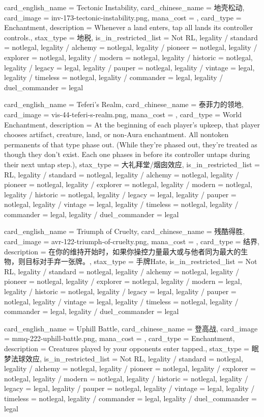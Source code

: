 \documentclass[lang = cn, color = black, 10pt]{AllThatStax}
\begin{document}
\card
{
	card_english_name = {Tectonic Instability},
	card_chinese_name = {地壳松动},
	card_image = inv-173-tectonic-instability.png,
	mana_cost = ,
	card_type = Enchantment,
	description = {Whenever a land enters, tap all lands its controller controls.},
	stax_type = 地税,
	is_in_restricted_list = Not RL,
	legality / standard = notlegal,
	legality / alchemy = notlegal,
	legality / pioneer = notlegal,
	legality / explorer = notlegal,
	legality / modern = notlegal,
	legality / historic = notlegal,
	legality / legacy = legal,
	legality / pauper = notlegal,
	legality / vintage = legal,
	legality / timeless = notlegal,
	legality / commander = legal,
	legality / duel_commander = legal
}

\card
{
	card_english_name = {Teferi's Realm},
	card_chinese_name = {泰菲力的领地},
	card_image = vis-44-teferi-s-realm.png,
	mana_cost = ,
	card_type = World Enchantment,
	description = {At the beginning of each player's upkeep, that player chooses artifact, creature, land, or non-Aura enchantment. All nontoken permanents of that type phase out. (While they're phased out, they're treated as though they don't exist. Each one phases in before its controller untaps during their next untap step.)},
	stax_type = 大礼拜堂/烟囱效应,
	is_in_restricted_list = RL,
	legality / standard = notlegal,
	legality / alchemy = notlegal,
	legality / pioneer = notlegal,
	legality / explorer = notlegal,
	legality / modern = notlegal,
	legality / historic = notlegal,
	legality / legacy = legal,
	legality / pauper = notlegal,
	legality / vintage = legal,
	legality / timeless = notlegal,
	legality / commander = legal,
	legality / duel_commander = legal
}

\card
{
	card_english_name = {Triumph of Cruelty},
	card_chinese_name = {残酷得胜},
	card_image = avr-122-triumph-of-cruelty.png,
	mana_cost = ,
	card_type = 结界,
	description = {在你的维持开始时，如果你操控力量最大或与他者同为最大的生物，则目标对手弃一张牌。},
	stax_type = 手牌Hate,
	is_in_restricted_list = Not RL,
	legality / standard = notlegal,
	legality / alchemy = notlegal,
	legality / pioneer = notlegal,
	legality / explorer = notlegal,
	legality / modern = legal,
	legality / historic = notlegal,
	legality / legacy = legal,
	legality / pauper = notlegal,
	legality / vintage = legal,
	legality / timeless = notlegal,
	legality / commander = legal,
	legality / duel_commander = legal
}

\card
{
	card_english_name = {Uphill Battle},
	card_chinese_name = {登高战},
	card_image = mmq-222-uphill-battle.png,
	mana_cost = ,
	card_type = Enchantment,
	description = {Creatures played by your opponents enter tapped.},
	stax_type = 眠梦法球效应,
	is_in_restricted_list = Not RL,
	legality / standard = notlegal,
	legality / alchemy = notlegal,
	legality / pioneer = notlegal,
	legality / explorer = notlegal,
	legality / modern = notlegal,
	legality / historic = notlegal,
	legality / legacy = legal,
	legality / pauper = notlegal,
	legality / vintage = legal,
	legality / timeless = notlegal,
	legality / commander = legal,
	legality / duel_commander = legal
}
\end{document}
